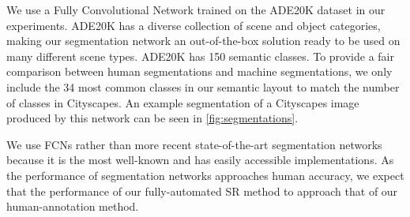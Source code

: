 \documentclass[10pt,twocolumn,letterpaper]{article}
\begin{document}
We use a Fully Convolutional Network \cite{FullyConvolutionalSS} trained on the
ADE20K dataset \cite{ADE20K} in our experiments. ADE20K has a diverse
collection of scene and object categories, making our segmentation network an
out-of-the-box solution ready to be used on many different scene types.
ADE20K has 150 semantic classes. To provide a fair comparison between human
segmentations and machine segmentations, we only include the 34 most common
classes in our semantic layout to match the number of classes in Cityscapes. An
example segmentation of a Cityscapes image produced by this network can be seen
in \ref{fig:segmentations}.

We use FCNs rather than more recent state-of-the-art segmentation networks
because it is the most well-known and has easily accessible implementations. As
the performance of segmentation networks approaches human accuracy, we expect
that the performance of our fully-automated SR method to approach that of our
human-annotation method.
\end{document}
